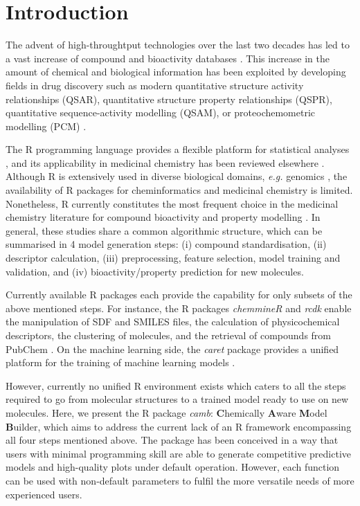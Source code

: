 \documentclass{bioinfo}
\begin{document}
\section{Introduction}

The advent of high-throughtput technologies over the last two decades 
has led to a vast increase of compound and bioactivity databases \citep{bender_databases,chembl,pubchem}.
This increase in the amount of chemical and biological information 
has been exploited by developing fields in drug discovery 
such as modern quantitative structure activity relationships (QSAR), 
quantitative structure property relationships (QSPR), quantitative sequence-activity modelling (QSAM), 
or proteochemometric modelling (PCM) \citep{review_pcm,cortesReview}.

The R programming language provides a flexible platform for statistical analyses \citep{Rlanguage},
and its applicability in medicinal chemistry has been reviewed elsewhere \citep{mente}.
Although R is extensively used in diverse biological domains, {\it e.g.} genomics \citep{bioconductor},
the availability of R packages for cheminformatics and medicinal chemistry is limited. %
Nonetheless, R currently constitutes the most frequent choice in the medicinal chemistry literature
for compound bioactivity and property modelling \citep{mente}.
In general, these studies share a common algorithmic structure, which can be summarised in 4 model generation steps:
(i) compound standardisation, (ii) descriptor calculation,
(iii) preprocessing, feature selection, model training and validation, and (iv) bioactivity/property prediction for new molecules.

Currently available R packages each provide the capability for only subsets of the above mentioned steps.
For instance, the R packages {\it chemmineR} \citep{chemmineR} and {\it rcdk} \citep{rcdk} enable the manipulation of SDF and SMILES
files, the calculation of physicochemical descriptors, the clustering of molecules,
and the retrieval of compounds from PubChem \citep{pubchem}.
On the machine learning side, the {\it caret} package provides a
unified platform for the training of machine learning models \citep{caret}.

However, currently no unified R environment exists which caters to all the steps required to go from molecular structures to a trained model ready to use on new molecules.
Here, we present the R package {\it camb}: {\bf C}hemically {\bf A}ware {\bf M}odel {\bf B}uilder,
which aims to address the current lack of an R framework encompassing all four steps mentioned above.
The package has been conceived in a way that users with minimal
programming skill are able to generate competitive predictive models and high-quality plots
under default operation.
However, each function can be used with non-default parameters to fulfil the more versatile needs of more experienced users.
\end{document}

